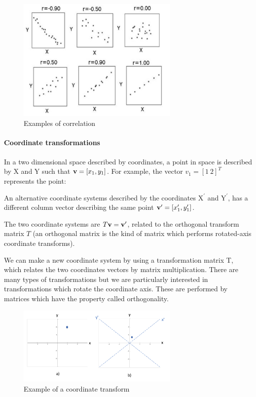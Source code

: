 \documentclass[11pt, oneside]{article}   	%
\begin{document}
\begin{figure}[!h]
	\centering
	\includegraphics[width=0.7\textwidth]{examples-correlation}
	\caption{Examples of correlation}
	\label{fig:MeanVariance}
\end{figure}



\paragraph{Coordinate transformations}
\paragraph{}
In a two dimensional space described by coordinates, a point in space is described by X and Y such that ${\bf v} = [x_1, y_1]$. For example, the vector $v_1 = [1 ~2]^T$ represents the point:

An alternative coordinate systems described by the coordinates $\text{X}^\prime$ and $\text{Y}^\prime$, has a different column vector describing the same point ${\bf v^\prime} = [x_1^\prime, y_1^\prime]$.

The two coordinate systems are $T{\bf v} = {\bf v}^\prime$, related to the orthogonal transform matrix $T$ (an orthogonal matrix is the kind of matrix which performs rotated-axis coordinate transforms). 

We can make a new coordinate system by using a transformation matrix T, which relates the two coordinates vectors by matrix multiplication. There are many types of transformations but we are particularly interested in transformations which rotate the coordinate axis. These are performed by matrices which have the property called orthogonality.

\begin{figure}[!h]
	\centering
	\includegraphics[width=0.7\textwidth]{example-coordinate-transform}
	\caption{Example of a coordinate transform}
	\label{fig:CoordinateTransform}
\end{figure}
\end{document}
